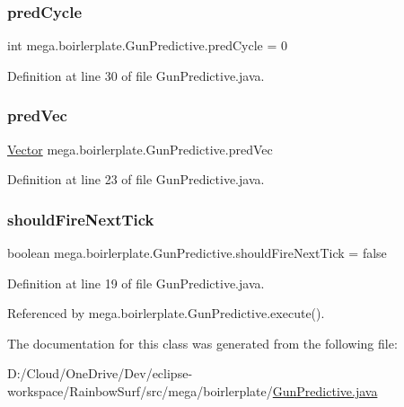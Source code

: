 \subsubsection{\texorpdfstring{pred\+Cycle}{predCycle}}
{\footnotesize\ttfamily int mega.\+boirlerplate.\+Gun\+Predictive.\+pred\+Cycle = 0\hspace{0.3cm}{\ttfamily [private]}}



Definition at line 30 of file Gun\+Predictive.\+java.

\mbox{\label{classmega_1_1boirlerplate_1_1_gun_predictive_aacfa7c3d0fc4977c5154cbc3d2365ded}} 
\subsubsection{\texorpdfstring{pred\+Vec}{predVec}}
{\footnotesize\ttfamily \hyperlink{classmega_1_1boirlerplate_1_1_vector}{Vector} mega.\+boirlerplate.\+Gun\+Predictive.\+pred\+Vec\hspace{0.3cm}{\ttfamily [private]}}



Definition at line 23 of file Gun\+Predictive.\+java.

\mbox{\label{classmega_1_1boirlerplate_1_1_gun_predictive_afe969b433ba483c7a6334799599b7cff}} 
\subsubsection{\texorpdfstring{should\+Fire\+Next\+Tick}{shouldFireNextTick}}
{\footnotesize\ttfamily boolean mega.\+boirlerplate.\+Gun\+Predictive.\+should\+Fire\+Next\+Tick = false\hspace{0.3cm}{\ttfamily [private]}}



Definition at line 19 of file Gun\+Predictive.\+java.



Referenced by mega.\+boirlerplate.\+Gun\+Predictive.\+execute().



The documentation for this class was generated from the following file\+:\begin{DoxyCompactItemize}
\item 
D\+:/\+Cloud/\+One\+Drive/\+Dev/eclipse-\/workspace/\+Rainbow\+Surf/src/mega/boirlerplate/\hyperlink{_gun_predictive_8java}{Gun\+Predictive.\+java}\end{DoxyCompactItemize}
